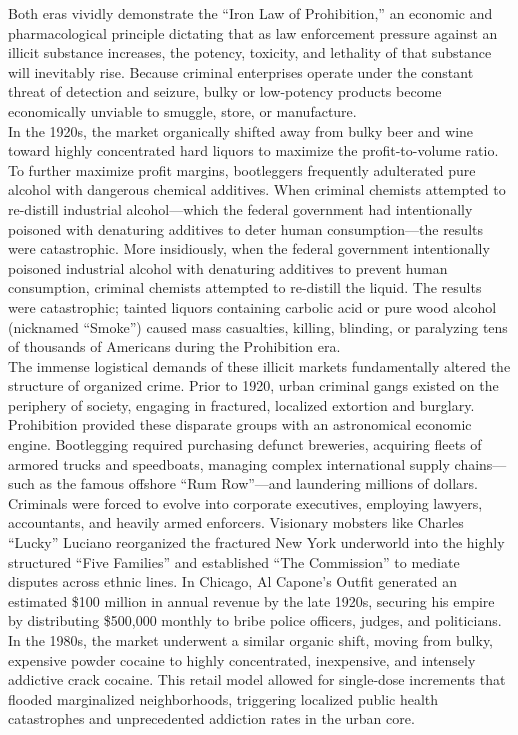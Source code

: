 \documentclass[
]{article}
\begin{document}
Both eras vividly demonstrate the ``Iron Law of Prohibition,'' an
economic and pharmacological principle dictating that as law enforcement
pressure against an illicit substance increases, the potency, toxicity,
and lethality of that substance will inevitably rise. Because criminal
enterprises operate under the constant threat of detection and seizure,
bulky or low-potency products become economically unviable to smuggle,
store, or manufacture.\\
In the 1920s, the market organically shifted away from bulky beer and
wine toward highly concentrated hard liquors to maximize the
profit-to-volume ratio. To further maximize profit margins, bootleggers
frequently adulterated pure alcohol with dangerous chemical additives.
When criminal chemists attempted to re-distill industrial
alcohol---which the federal government had intentionally poisoned with
denaturing additives to deter human consumption---the results were
catastrophic. More insidiously, when the federal government intentionally poisoned
industrial alcohol with denaturing additives to prevent human
consumption, criminal chemists attempted to re-distill the liquid. The
results were catastrophic; tainted liquors containing carbolic acid or
pure wood alcohol (nicknamed ``Smoke'') caused mass casualties, killing,
blinding, or paralyzing tens of thousands of Americans during the
Prohibition era.\\
The immense logistical demands of these illicit markets fundamentally
altered the structure of organized crime. Prior to 1920, urban criminal
gangs existed on the periphery of society, engaging in fractured,
localized extortion and burglary. Prohibition provided these disparate
groups with an astronomical economic engine. Bootlegging required
purchasing defunct breweries, acquiring fleets of armored trucks and
speedboats, managing complex international supply chains---such as the
famous offshore ``Rum Row''---and laundering millions of dollars.
Criminals were forced to evolve into corporate executives, employing
lawyers, accountants, and heavily armed enforcers. Visionary mobsters
like Charles ``Lucky'' Luciano reorganized the fractured New York
underworld into the highly structured ``Five Families'' and established
``The Commission'' to mediate disputes across ethnic lines. In Chicago,
Al Capone's Outfit generated an estimated \$100 million in annual
revenue by the late 1920s, securing his empire by distributing \$500,000
monthly to bribe police officers, judges, and politicians.\\
In the 1980s, the market underwent a similar organic shift, moving from
bulky, expensive powder cocaine to highly concentrated, inexpensive, and
intensely addictive crack cocaine. This retail model allowed for
single-dose increments that flooded marginalized neighborhoods,
triggering localized public health catastrophes and unprecedented
addiction rates in the urban core.
\end{document}
